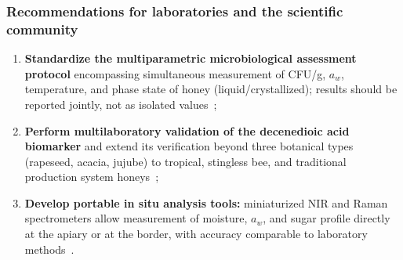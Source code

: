 \subsubsection{Recommendations for laboratories and the scientific community}

\begin{enumerate}
    \item \textbf{Standardize the multiparametric microbiological
          assessment protocol} encompassing simultaneous measurement
          of CFU/g, $a_w$, temperature, and phase state of honey
          (liquid/crystallized); results should be reported
          jointly, not as isolated values~\cite{zamora2006,analytica2020};
    \item \textbf{Perform multilaboratory validation of the
          decenedioic acid biomarker} and extend its verification
          beyond three botanical types (rapeseed, acacia, jujube)
          to tropical, stingless bee, and traditional production
          system honeys~\cite{sun2021};
    \item \textbf{Develop portable in situ analysis tools:}
          miniaturized NIR and Raman spectrometers allow
          measurement of moisture, $a_w$, and sugar profile
          directly at the apiary or at the border, with accuracy
          comparable to laboratory
          methods~\cite{honeyid2025,schoder2026}.
\end{enumerate}
